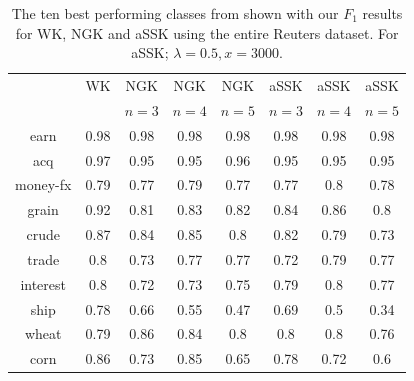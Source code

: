 \begin{table}[!htb]
	\centering
	\small	
	\begin{tabular}{| c | c | c | c | c | c | c | c |}\hline
		& WK & NGK & NGK  & NGK  & aSSK & aSSK& aSSK \\ 
		&  & $n = 3$& $ n = 4 $ & $ n = 5 $ & $ n = 3 $& $ n = 4 $ & $ n = 5 $ \\ \hline
		earn & 0.98 & 0.98 &  0.98&  0.98 & 0.98 & 0.98 & 0.98 \\ \hline
		acq & 0.97 & 0.95 &  0.95 &  0.96 & 0.95 & 0.95 & 0.95 \\ \hline
		money-fx & 0.79 & 0.77 &  0.79 & 0.77 & 0.77 & 0.8 & 0.78 \\ \hline
		grain & 0.92 & 0.81 &  0.83& 0.82 & 0.84 & 0.86 & 0.8 \\ \hline
		crude & 0.87 & 0.84 &  0.85 & 0.8 & 0.82 & 0.79 & 0.73 \\ \hline
		trade & 0.8 & 0.73 &  0.77 & 0.77 & 0.72 & 0.79 & 0.77 \\ \hline
		interest & 0.8 & 0.72 &  0.73 & 0.75 & 0.79 & 0.8 & 0.77 \\ \hline
		ship & 0.78 & 0.66 &  0.55 & 0.47 & 0.69 & 0.5 & 0.34 \\ \hline
		wheat & 0.79 & 0.86 &  0.84 & 0.8 & 0.8 & 0.8 & 0.76 \\ \hline
		corn & 0.86 & 0.73 &  0.85 & 0.65 & 0.78 & 0.72 & 0.6 \\ \hline	
	\end{tabular}
	\caption{The ten best performing classes from \cite{lodhi} shown with our $ F_1 $ results for WK, NGK and  aSSK using the entire Reuters dataset. For aSSK; $ \lambda = 0.5, x = 3000$\label{tab:full_data}. }
\end{table}


